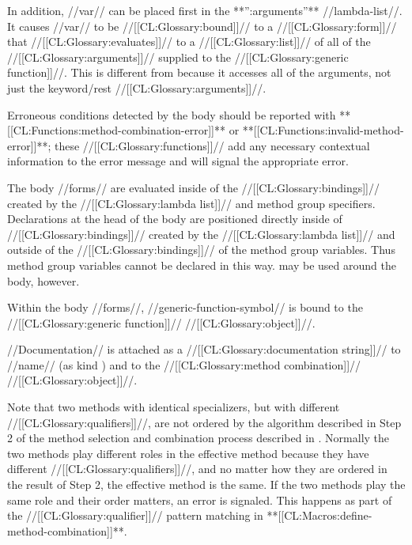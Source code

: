 In addition,  //var// can be placed first in the **'':arguments''** //lambda-list//. It causes //var// to be //[[CL:Glossary:bound]]// to a //[[CL:Glossary:form]]// that //[[CL:Glossary:evaluates]]// to a //[[CL:Glossary:list]]// of all of the //[[CL:Glossary:arguments]]// supplied to the //[[CL:Glossary:generic function]]//. This is different from  because it accesses all of the arguments, not just the keyword/rest //[[CL:Glossary:arguments]]//.

Erroneous conditions detected by the body should be reported with **[[CL:Functions:method-combination-error]]** or **[[CL:Functions:invalid-method-error]]**; these //[[CL:Glossary:functions]]// add any necessary contextual information to the error message and will signal the appropriate error.

The body //forms// are evaluated inside of the //[[CL:Glossary:bindings]]// created by the //[[CL:Glossary:lambda list]]// and method group specifiers.  Declarations at the head of the body are positioned directly inside of //[[CL:Glossary:bindings]]// created by the //[[CL:Glossary:lambda list]]// and outside of the //[[CL:Glossary:bindings]]// of the method group variables. Thus method group variables cannot be declared in this way.  may be used around the body, however.

Within the body //forms//, //generic-function-symbol// is bound to the //[[CL:Glossary:generic function]]// //[[CL:Glossary:object]]//.

//Documentation// is attached as a //[[CL:Glossary:documentation string]]// to //name// (as kind ) and to the //[[CL:Glossary:method combination]]// //[[CL:Glossary:object]]//.






Note that two methods with identical specializers, but with different //[[CL:Glossary:qualifiers]]//, are not ordered by the algorithm described in Step 2 of the method selection and combination process described in \secref\MethodSelectionAndCombination. Normally the two methods play different roles in the effective method because they have different //[[CL:Glossary:qualifiers]]//, and no matter how they are ordered in the result of Step 2, the effective method is the same. If the two methods play the same role and their order matters,  an error is signaled. This happens as part of the //[[CL:Glossary:qualifier]]// pattern matching in **[[CL:Macros:define-method-combination]]**.

